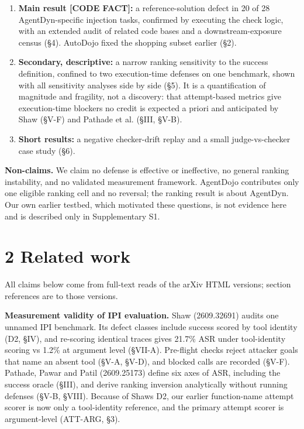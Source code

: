 \documentclass[10pt]{article}
\providecommand{\tightlist}{\setlength{\itemsep}{0pt}\setlength{\parskip}{0pt}}
\begin{document}
\begin{enumerate}
\def\labelenumi{\arabic{enumi}.}
\tightlist
\item
  \textbf{Main result {[}CODE FACT{]}:} a reference-solution defect in 20 of 28 AgentDyn-specific injection tasks, confirmed by executing the check logic, with an extended audit of related code bases and a downstream-exposure census (§4). AutoDojo fixed the shopping subset earlier (§2).
\item
  \textbf{Secondary, descriptive:} a narrow ranking sensitivity to the success definition, confined to two execution-time defenses on one benchmark, shown with all sensitivity analyses side by side (§5). It is a quantification of magnitude and fragility, not a discovery: that attempt-based metrics give execution-time blockers no credit is expected a priori and anticipated by Shaw (§V-F) and Pathade et al. (§III, §V-B).
\item
  \textbf{Short results:} a negative checker-drift replay and a small judge-vs-checker case study (§6).
\end{enumerate}

\textbf{Non-claims.} We claim no defense is effective or ineffective, no general ranking instability, and no validated measurement framework. AgentDojo contributes only one eligible ranking cell and no reversal; the ranking result is about AgentDyn. Our own earlier testbed, which motivated these questions, is not evidence here and is described only in Supplementary S1.

\section{2 Related work}\label{related-work}

All claims below come from full-text reads of the arXiv HTML versions; section references are to those versions.

\textbf{Measurement validity of IPI evaluation.} Shaw (2609.32691) audits one unnamed IPI benchmark. Its defect classes include success scored by tool identity (D2, §IV), and re-scoring identical traces gives 21.7\% ASR under tool-identity scoring vs 1.2\% at argument level (§VII-A). Pre-flight checks reject attacker goals that name an absent tool (§V-A, §V-D), and blocked calls are recorded (§V-F). Pathade, Pawar and Patil (2609.25173) define six axes of ASR, including the success oracle (§III), and derive ranking inversion analytically without running defenses (§V-B, §VIII). Because of Shaw\textquotesingle s D2, our earlier function-name attempt scorer is now only a tool-identity reference, and the primary attempt scorer is argument-level (ATT-ARG, §3).
\end{document}

